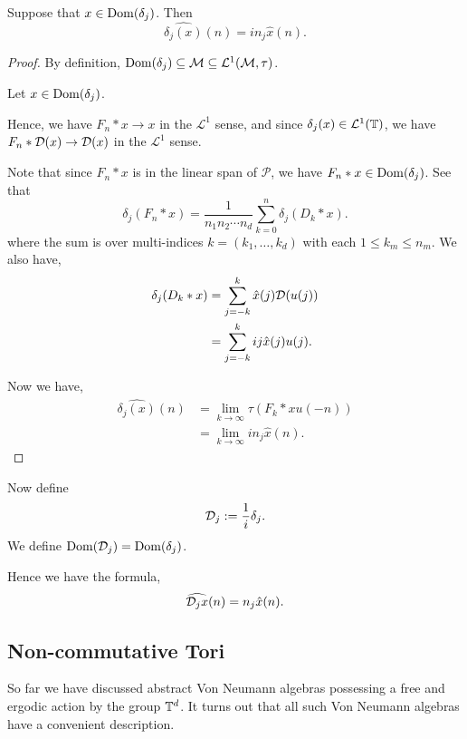 \begin{proposition}
    Suppose that $x \in \operatorname{Dom}(\delta_j)$. Then 
    \begin{equation}
        \widehat{\delta_j(x)}(n) = in_j\widehat{x}(n).
    \end{equation}
\end{proposition}
\begin{proof}
    By definition, $\operatorname{Dom}(\delta_j) \subseteq \mathcal{M} \subseteq \mathcal{L}^1(\mathcal{M},\tau)$. 
    
    Let $x \in \operatorname{Dom}(\delta_j)$.
    
    Hence, we have $F_n*x\rightarrow x$ in the $\mathcal{L}^1$ sense, and since $\delta_j(x) \in \mathcal{L}^1(\mathbb{T})$, we have $F_n*\mathcal{D}(x)\rightarrow \mathcal{D}(x)$ in the $\mathcal{L}^1$ sense. 
    
    Note that since $F_n*x$ is in the linear span of $\mathcal{P}$, we
    have $F_n*x \in \operatorname{Dom}(\delta_j)$. See that
    \begin{equation}
        \delta_j(F_n *x) = \frac{1}{n_1n_2\cdots n_d}\sum_{k=0}^n \delta_j(D_k* x).
    \end{equation}
    where the sum is over multi-indices $k = (k_1,\ldots,k_d)$ with each $1\leq k_m \leq n_m$.
    We also have,
    \begin{align}
        \delta_j(D_k* x) &= \sum_{j=-k}^k \hat{x}(j)\mathcal{D}(u(j))\\
        &= \sum_{j=-k}^k ij\hat{x}(j)u(j).        
    \end{align}
    
    Now we have,
    \begin{align}
        \widehat{\delta_j(x)}(n) &= \lim_{k\rightarrow\infty} \tau(F_k*xu(-n))\\
                           &= \lim_{k\rightarrow\infty} in_j\hat{x}(n).
    \end{align} 
    
    
\end{proof}


Now define 
\begin{equation}
    \mathcal{D}_j := \frac{1}{i} \delta_j.
\end{equation}
We define $\operatorname{Dom}(\mathcal{D}_j) = \operatorname{Dom}(\delta_j)$.

Hence we have the formula,
\begin{equation}
    \widehat{\mathcal{D}_j x}(n) = n_j\hat{x}(n).
\end{equation}

\subsection{Non-commutative Tori}
So far we have discussed abstract Von Neumann algebras
possessing a free and ergodic action by the group $\mathbb{T}^d$. It turns
out that all such Von Neumann algebras have a convenient description. 

